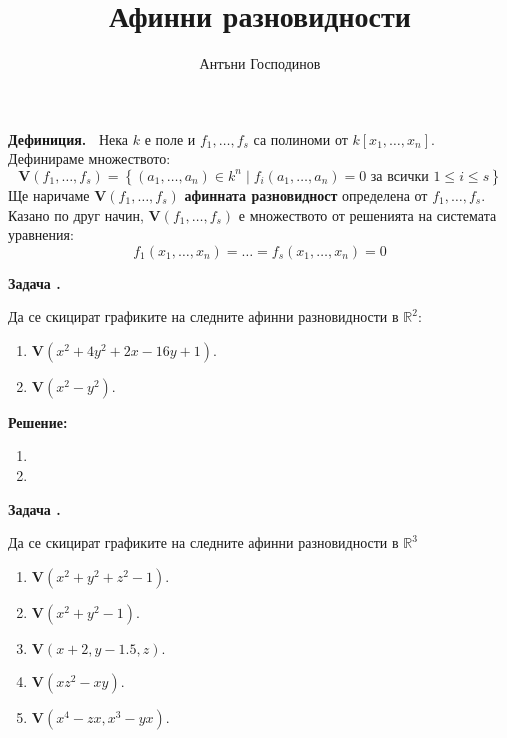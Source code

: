 \documentclass[a4paper,12pt,fleqn]{article}
\title{Афинни разновидности}
\author{Антъни Господинов}
\date{}
\newcounter{problem}
\newcommand\problem{%
  \stepcounter{problem}%
  \textbf{Задача \theproblem.}~%
}
\newcommand\solution{%
  \textbf{Решение:}~%
}
\begin{document}
    \maketitle
    \textbf{Дефиниция.~} Нека \( k \) е поле и \( f_{1},\dots,f_{s} \) са полиноми от \( k \left[ x_{1},\dots,x_{n} \right] \). Дефинираме множеството: 
    \begin{equation*}
        \mathbf{V}\left( f_{1},\dots,f_{s} \right)=\left\{ \left( a_{1},\dots,a_{n} \right) \in k^{n} \mid f_{i}(a_{1},\dots,a_{n})=0 \textit{ за всички } 1 \leq i \leq s \right\}
    \end{equation*}
    Ще наричаме \( \textbf{V}\left( f_{1},\dots,f_{s} \right) \) \textbf{афинната разновидност} определена от \( f_{1},\dots,f_{s} \). Казано по друг начин, \( \textbf{V}\left( f_{1},\dots,f_{s} \right) \) е множеството от решенията на системата уравнения: 
    \begin{equation*}
        f_{1}(x_{1},\dots,x_{n}) = \dots = f_{s}(x_{1},\dots,x_{n}) = 0
    \end{equation*} 

    \problem{Да се скицират графиките на следните афинни разновидности в \( \mathbb{R}^{2} \):
    \begin{enumerate}
        \item \( \mathbf{V}(x^{2}+4y^{2}+2x-16y+1) \).
        \item \( \mathbf{V}(x^{2}-y^{2}) \).
    \end{enumerate}
    }

    \solution{
        \begin{enumerate}
            \item 
                \begin{minipage}[t]{\linewidth}
                    \raggedright
                \end{minipage}
                \item 
                \begin{minipage}[t]{\linewidth}
                    \raggedright
                \end{minipage}
        \end{enumerate} 
    }

    \problem{Да се скицират графиките на следните афинни разновидности в \( \mathbb{R}^{3} \)
    \begin{enumerate}
        \item \( \mathbf{V}(x^{2}+y^{2}+z^{2}-1) \).
        \item \( \mathbf{V}(x^{2}+y^{2}-1) \).
        \item \( \mathbf{V}(x+2,y-1.5,z) \).
        \item \( \mathbf{V}(xz^{2}-xy) \).
        \item \( \mathbf{V}(x^{4}-zx,x^{3}-yx) \).
    \end{enumerate}}
\end{document}
